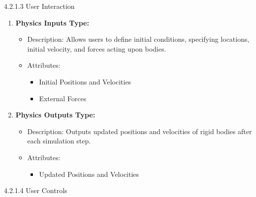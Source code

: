 \documentclass[
]{article}
\begin{document}
4.2.1.3 User Interaction

\begin{enumerate}
\def\labelenumi{\arabic{enumi}.}
\setcounter{enumi}{6}
\item
  \textbf{Physics Inputs Type:}

  \begin{itemize}
  \item
    Description: Allows users to define initial conditions, specifying
    locations, initial velocity, and forces acting upon bodies.
  \item
    Attributes:

    \begin{itemize}
    \item
      Initial Positions and Velocities
    \item
      External Forces
    \end{itemize}
  \end{itemize}
\item
  \textbf{Physics Outputs Type:}

  \begin{itemize}
  \item
    Description: Outputs updated positions and velocities of rigid
    bodies after each simulation step.
  \item
    Attributes:

    \begin{itemize}
    \item
      Updated Positions and Velocities
    \end{itemize}
  \end{itemize}
\end{enumerate}

4.2.1.4 User Controls
\end{document}
